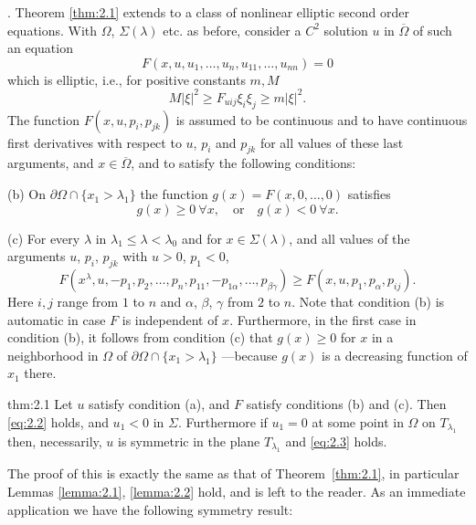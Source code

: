 . Theorem \ref{thm:2.1} extends to a class of nonlinear elliptic second order equations.
With $\Omega$, $\Sigma(\lambda)$ etc.\! as before, consider a $C^2$ solution $u$
in $\overline{\Omega}$ of such an equation
\begin{equation}\label{eq:2.1prime}
  F(x, u, u_1, \ldots, u_n, u_{11}, \ldots, u_{nn}) = 0 \tag{$2.1'$}
\end{equation}
which is elliptic, i.e., for positive constants $m,M$
\[M|\xi|^2 \geq F_{uij}\xi_i\xi_j \geq m|\xi|^2.\]
The function $F(x, u, p_i, p_{jk})$ is assumed to be continuous and to have continuous first
derivatives with respect to $u$, $p_i$ and $p_{jk}$ for all values of these last arguments,
and $x\in\overline{\Omega}$, and to satisfy the following conditions:

(b) On $\partial\Omega\cap\{x_1>\lambda_1\}$ the function $g(x) = F(x,0,\ldots,0)$
satisfies
\[g(x)\geq 0\ \forall x, \quad \text{or} \quad
  g(x)<0\ \forall x.\]

(c) For every $\lambda$ in $\lambda_1\leq\lambda<\lambda_0$
and for $x\in\Sigma(\lambda)$, and all values of the arguments $u$, $p_i$,
$p_{jk}$ with $u>0$, $p_1<0$,
\begin{equation}\label{eq:2.6}
  F(x^\lambda, u, -p_1, p_2, \ldots, p_n, p_{11}, -p_{1\alpha}, \ldots,
    p_{\beta\gamma}) \geq F(x,u,p_1,p_{\alpha},p_{ij}).
\end{equation}
Here $i,j$ range from $1$ to $n$ and $\alpha$, $\beta$, $\gamma$
from $2$ to $n$.
Note that condition (b) is automatic in case $F$ is independent of $x$.
Furthermore, in the first case in condition (b),
it follows from condition (c) that $g(x)\geq 0$
for $x$ in a neighborhood in $\Omega$ of $\partial\Omega\cap\{x_1>\lambda_1\}$%
---because $g(x)$ is a decreasing function of $x_1$ there.

\begin{theoremp}{thm:2.1}\label{thm:2.1prime}
  Let $u$ satisfy condition (a), and $F$ satisfy conditions (b) and (c).
  Then \eqref{eq:2.2} holds, and $u_1<0$ in $\Sigma$.
  Furthermore if $u_1=0$ at some point in $\Omega$ on $T_{\lambda_1}$ then,
  necessarily, $u$ is symmetric in the plane $T_{\lambda_1}$ and \eqref{eq:2.3} holds.
\end{theoremp}

The proof of this is exactly the same as that of Theorem~\ref{thm:2.1},
in particular Lemmas \ref{lemma:2.1}, \ref{lemma:2.2} hold,
and is left to the reader. As an immediate application we have the following symmetry result:

